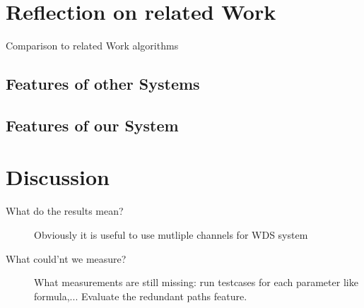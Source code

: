 \section{Reflection on related Work}
  Comparison to related Work algorithms\newline
  \subsection{Features of other Systems}
  \subsection{Features of our System}
\section{Discussion}
  \begin{description}
   \item [What do the results mean?]
   Obviously it is useful to use mutliple channels for WDS system
   \item[What could'nt we measure?]
   What measurements are still missing:  run testcases for each parameter like formula,...
   Evaluate the redundant paths feature.
  \end{description}